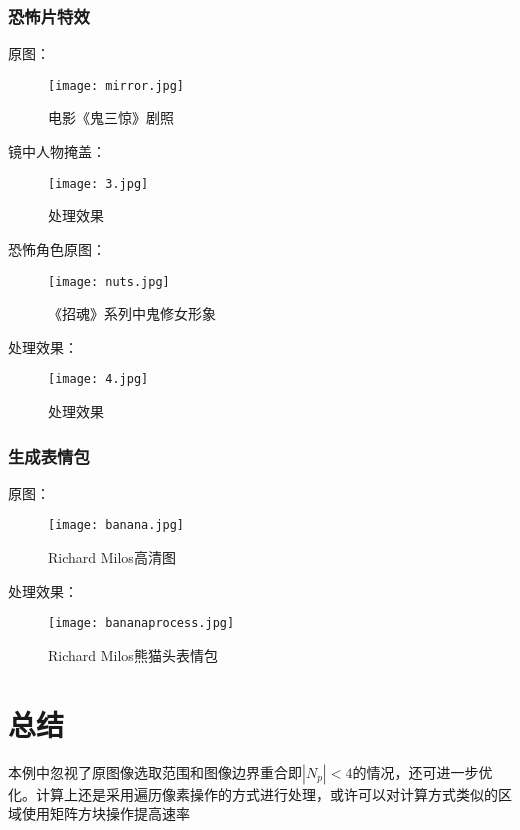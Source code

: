 \documentclass[14pt]{scrartcl} %
\begin{document}
\subsubsection{恐怖片特效}

原图：
\begin{figure}[h] %
	\centering
	\texttt{[image: mirror.jpg]} %
	\caption{电影《鬼三惊》剧照}
\end{figure}

镜中人物掩盖：
\begin{figure}[h] %
	\centering
	\texttt{[image: 3.jpg]} %
	\caption{处理效果}
\end{figure}

\pagebreak
恐怖角色原图：
\begin{figure}[h] %
	\centering
	\texttt{[image: nuts.jpg]} %
	\caption{《招魂》系列中鬼修女形象}
\end{figure}

处理效果：
\begin{figure}[h] %
	\centering
	\texttt{[image: 4.jpg]} %
	\caption{处理效果}
\end{figure}


\pagebreak
\subsubsection{生成表情包}
原图：
\begin{figure}[h] %
	\centering
	\texttt{[image: banana.jpg]} %
	\caption{Richard Milos高清图}
\end{figure}

处理效果：
\begin{figure}[h] %
	\centering
	\texttt{[image: bananaprocess.jpg]} %
	\caption{Richard Milos熊猫头表情包}
\end{figure}

\pagebreak
\section{总结}
本例中忽视了原图像选取范围和图像边界重合即$|N_p|<4$的情况，还可进一步优化。计算上还是采用遍历像素操作的方式进行处理，或许可以对计算方式类似的区域使用矩阵方块操作提高速率



\end{document}
